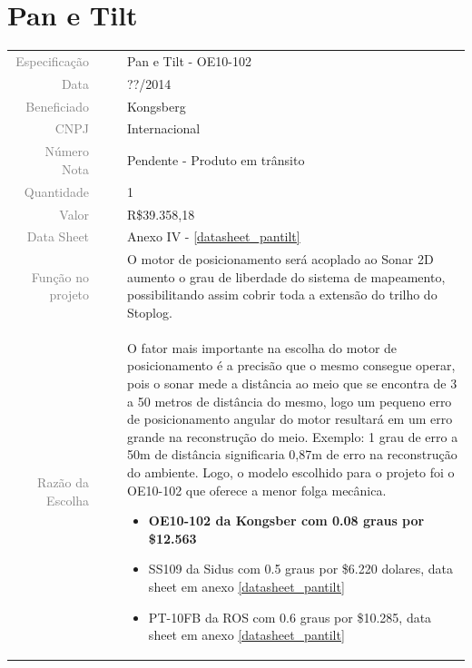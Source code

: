 

\section{Pan e Tilt}
\label{encoder}


\begin{table}[ht!]

	\begin{tabular}{r l|l p{12cm} }
		
		\textcolor{gray}{Especificação} &&& 	{Pan e Tilt - OE10-102}\\
		\textcolor{gray}{Data} &&& 				{??/2014}\\
        \textcolor{gray}{Beneficiado} &&&		{Kongsberg} \\
        \textcolor{gray}{CNPJ} &&& 				{Internacional} \\
        \textcolor{gray}{Número Nota} &&& 		{Pendente - Produto em trânsito} \\
		\textcolor{gray}{Quantidade} &&& 		{1} \\
		\textcolor{gray}{Valor} &&& 			{R\$39.358,18} \\
		\textcolor{gray}{Data Sheet} &&& 		{Anexo IV - \ref{datasheet_pantilt} } \\

		\textcolor{gray}{Função no projeto} &&& {O motor de posicionamento será acoplado ao Sonar 2D aumento o grau de liberdade do sistema de mapeamento, possibilitando assim cobrir toda a extensão do trilho do Stoplog.} \\
		\textcolor{gray}{Razão da Escolha} &&& {O fator mais importante na escolha do motor de posicionamento é a precisão que o mesmo consegue operar, pois o sonar mede a distância ao meio que se encontra de 3 a 50 metros de distância do mesmo, logo um pequeno erro de posicionamento angular do motor resultará em um erro grande na reconstrução do meio. Exemplo: 1 grau de erro a 50m de distância significaria 0,87m de erro na reconstrução do ambiente. Logo, o modelo escolhido para o projeto foi o OE10-102 que oferece a menor folga mecânica. 
		\begin{itemize}
		  \item \textbf{OE10-102 da Kongsber com 0.08 graus por \$12.563} 
		  \item SS109 da Sidus com 0.5 graus por \$6.220 dolares, data sheet em anexo \ref{datasheet_pantilt} 
		  \item PT-10FB da ROS com 0.6 graus por \$10.285, data sheet em anexo \ref{datasheet_pantilt} 
		\end{itemize}}
		

	\end{tabular}
\end{table}



